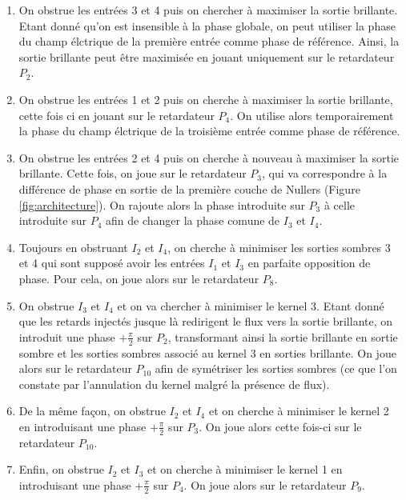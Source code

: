 \documentclass{aa}
\begin{document}
            \begin{enumerate}
                \item On obstrue les entrées 3 et 4 puis on chercher à maximiser la sortie brillante. Etant donné qu'on est insensible à la phase globale, on peut utiliser la phase du champ élctrique de la première entrée comme phase de référence. Ainsi, la sortie brillante peut être maximisée en jouant uniquement sur le retardateur $P_2$.
                \item On obstrue les entrées 1 et 2 puis on cherche à maximiser la sortie brillante, cette fois ci en jouant sur le retardateur $P_4$. On utilise alors temporairement la phase du champ élctrique de la troisième entrée comme phase de référence.
                \item On obstrue les entrées 2 et 4 puis on cherche à nouveau à maximiser la sortie brillante. Cette fois, on joue sur le retardateur $P_3$, qui va correspondre à la différence de phase en sortie de la première couche de Nullers (Figure \ref{fig:architecture}). On rajoute alors la phase introduite sur $P_3$ à celle introduite sur $P_4$ afin de changer la phase comune de $I_3$ et $I_4$.
                \item Toujours en obstruant $I_2$ et $I_4$, on cherche à minimiser les sorties sombres 3 et 4 qui sont supposé avoir les entrées $I_1$ et $I_3$ en parfaite opposition de phase. Pour cela, on joue alors sur le retardateur $P_8$.
                \item On obstrue $I_3$ et $I_4$ et on va chercher à minimiser le kernel 3. Etant donné que les retards injectés jusque là redirigent le flux vers la sortie brillante, on introduit une phase $+\frac{\pi}{2}$ sur $P_2$, transformant ainsi la sortie brillante en sortie sombre et les sorties sombres associé au kernel 3 en sorties brillante. On joue alors sur le retardateur $P_10$ afin de symétriser les sorties sombres (ce que l'on constate par l'annulation du kernel malgré la présence de flux).
                \item De la même façon, on obstrue $I_2$ et $I_4$ et on cherche à minimiser le kernel 2 en introduisant une phase $+\frac{\pi}{2}$ sur $P_3$. On joue alors cette fois-ci sur le retardateur $P_10$.
                \item Enfin, on obstrue $I_2$ et $I_3$ et on cherche à minimiser le kernel 1 en introduisant une phase $+\frac{\pi}{2}$ sur $P_4$. On joue alors sur le retardateur $P_9$.
            \end{enumerate}
\end{document}
